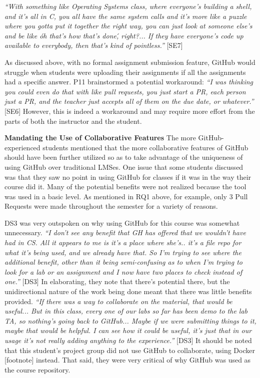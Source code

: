\textit{``With something like Operating Systems class, where everyone's building a shell, and it's all in C, you all have the same system calls and it's more like a puzzle where you gotta put it together the right way, you can just look at someone else's and be like \'oh that's how that's done\', right?... If they have everyone's code up available to everybody, then that's kind of pointless.''} [SE7]

As discussed above, with no formal assignment submission feature, GitHub would struggle when students were uploading their assignments if all the assignments had a specific answer. P11 brainstormed a potential workaround: \textit{``I was thinking you could even do that with like pull requests, you just start a PR, each person just a PR, and the teacher just accepts all of them on the due date, or whatever.''} [SE6] However, this is indeed a workaround and may require more effort from the parts of both the instructor and the student.

\textbf{Mandating the Use of Collaborative Features} \break
The more GitHub-experienced students mentioned that the more collaborative features of GitHub should have been further utilized so as to take advantage of the uniqueness of using GitHub over traditional LMSes. One issue that some students discussed was that they saw no point in using GitHub for classes if it was in the way their course did it. Many of the potential benefits were not realized because the tool was used in a basic level. As mentioned in RQ1 above, for example, only 3 Pull Requests were made throughout the semester for a variety of reasons.

DS3 was very outspoken on why using GitHub for this course was somewhat unnecessary. \textit{``I don't see any benefit that GH has offered that we wouldn't have had in CS. All it appears to me is it's a place where she's.. it's a file repo for what it's being used, and we already have that. So I'm trying to see where the additional benefit, other than it being semi-confusing as to when I'm trying to look for a lab or an assignment and I now have two places to check instead of one.''} [DS3] In elaborating, they note that there's potential there, but the unidirectional nature of the work being done meant that there was little benefits provided. \textit{``If there was a way to collaborate on the material, that would be useful... But in this class, every one of our labs so far has been demo to the lab TA, so nothing's going back to GitHub... Maybe if we were submitting things to it, maybe that would be helpful. I can see how it could be useful, it's just that in our usage it's not really adding anything to the experience.''} [DS3] It should be noted that this student's project group did not use GitHub to collaborate, using Docker [footnote] instead. That said, they were very critical of why GitHub was used as the course repository.

